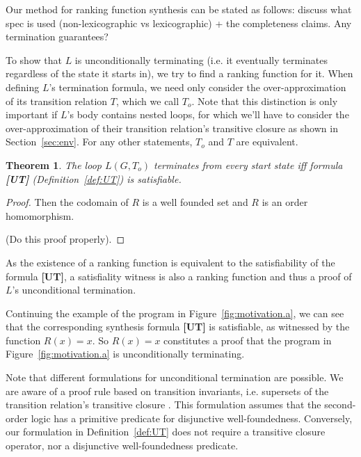 \documentclass[preprint]{sigplanconf}
\newtheorem{theorem}{Theorem}
\theoremstyle{definition}
\begin{document}
Our method for ranking function synthesis can be stated as follows:
discuss what spec is used (non-lexicographic vs lexicographic) + the completeness claims.
Any termination guarantees?  
\fi


To show that $L$ is unconditionally terminating (i.e. it eventually terminates regardless of the
state it starts in), we try to find a ranking function for it. When defining $L$'s termination 
formula, we need only consider the over-approximation of its transition relation $T$, which we call $T_o$.
Note that this distinction is only important if $L$'s body contains nested loops, for which we'll have to 
consider the over-approximation of their transition relation's transitive closure
as shown in Section~\ref{sec:env}. For any other statements, $T_o$ and $T$ are equivalent.

\begin{theorem}
\label{thm:ut}
 The loop $L(G, T_o)$ terminates from every start state iff formula {\bf [UT]} (Definition~\ref{def:UT}) is
 satisfiable.
\end{theorem}

\begin{proof}
 Then the codomain of $R$ is a well founded set and $R$ is an order homomorphism.

 (Do this proof properly).
\end{proof}

As the existence of a ranking function is equivalent to the satisfiability
of the formula {\bf [UT]}, a satisfiality witness 
is also a ranking function and thus a proof of $L$'s unconditional termination.

Continuing the example of the program in Figure~\ref{fig:motivation.a}, we can see that
the corresponding synthesis formula {\bf [UT]} is satisfiable, as witnessed by the function $R(x) = x$.
So $R(x) = x$ constitutes a proof that the program in Figure~\ref{fig:motivation.a} is unconditionally
terminating.

Note that different formulations for unconditional termination are possible.
We are aware of a proof rule based on transition invariants, i.e.  supersets
of the transition relation's transitive closure
\cite{DBLP:conf/pldi/GrebenshchikovLPR12}.  This formulation assumes that
the second-order logic has a primitive predicate for disjunctive
well-foundedness.  Conversely, our formulation in Definition~\ref{def:UT}
does not require a transitive closure operator, nor a disjunctive
well-foundedness predicate.  \\
\end{document}
